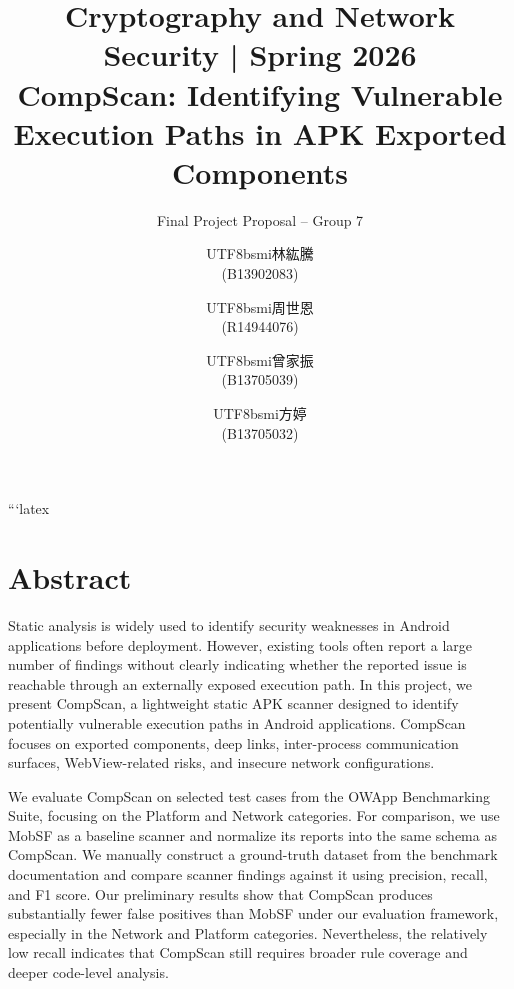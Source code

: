 \documentclass[sigconf, nonacm]{acmart}
\begin{document}
\title{Cryptography and Network Security | Spring 2026 \\ CompScan: Identifying Vulnerable Execution Paths in APK Exported Components}
\subtitle{Final Project Proposal -- Group 7}

\author{\begin{CJK*}{UTF8}{bsmi}林紘騰\end{CJK*} (B13902083)}

\author{\begin{CJK*}{UTF8}{bsmi}周世恩\end{CJK*} (R14944076)}

\author{\begin{CJK*}{UTF8}{bsmi}曾家振\end{CJK*} (B13705039)}

\author{\begin{CJK*}{UTF8}{bsmi}方婷\end{CJK*} (B13705032)}

\maketitle


```latex
\section{Abstract}

Static analysis is widely used to identify security weaknesses in Android applications before deployment. However, existing tools often report a large number of findings without clearly indicating whether the reported issue is reachable through an externally exposed execution path. In this project, we present CompScan, a lightweight static APK scanner designed to identify potentially vulnerable execution paths in Android applications. CompScan focuses on exported components, deep links, inter-process communication surfaces, WebView-related risks, and insecure network configurations. 

We evaluate CompScan on selected test cases from the OWApp Benchmarking Suite, focusing on the Platform and Network categories. For comparison, we use MobSF as a baseline scanner and normalize its reports into the same schema as CompScan. We manually construct a ground-truth dataset from the benchmark documentation and compare scanner findings against it using precision, recall, and F1 score. Our preliminary results show that CompScan produces substantially fewer false positives than MobSF under our evaluation framework, especially in the Network and Platform categories. Nevertheless, the relatively low recall indicates that CompScan still requires broader rule coverage and deeper code-level analysis.
\end{document}
